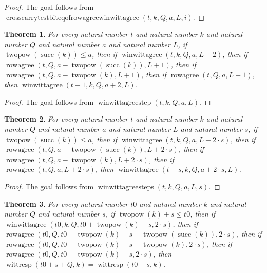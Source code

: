 \documentclass[11pt]{article}
\newtheorem{theorem}{Theorem}[section]
\theoremstyle{definition}
\begin{document}
\begin{proof}
The goal follows from \(\operatorname{crosscarrytestbiteqofrowagreewinwittagree}(t, k, Q, a, L, i)\).
\end{proof}
\begin{theorem}
\label{ll:paper:winwittagree-step}
For every natural number \(t\) and natural number \(k\) and natural number \(Q\) and natural number \(a\) and natural number \(L\), if \(\operatorname{twopow}(\operatorname{succ}(k)) \le a\), then if \(\operatorname{winwittagree}(t, k, Q, a, L + 2)\), then if \(\operatorname{rowagree}(t, Q, a - \operatorname{twopow}(\operatorname{succ}(k)), L + 1)\), then if \(\operatorname{rowagree}(t, Q, a - \operatorname{twopow}(k), L + 1)\), then if \(\operatorname{rowagree}(t, Q, a, L + 1)\), then \(\operatorname{winwittagree}(t + 1, k, Q, a + 2, L)\).
\end{theorem}
\begin{proof}
The goal follows from \(\operatorname{winwittagreestep}(t, k, Q, a, L)\).
\end{proof}
\begin{theorem}
\label{ll:paper:winwittagree-steps}
For every natural number \(t\) and natural number \(k\) and natural number \(Q\) and natural number \(a\) and natural number \(L\) and natural number \(s\), if \(\operatorname{twopow}(\operatorname{succ}(k)) \le a\), then if \(\operatorname{winwittagree}(t, k, Q, a, L + 2 \cdot s)\), then if \(\operatorname{rowagree}(t, Q, a - \operatorname{twopow}(\operatorname{succ}(k)), L + 2 \cdot s)\), then if \(\operatorname{rowagree}(t, Q, a - \operatorname{twopow}(k), L + 2 \cdot s)\), then if \(\operatorname{rowagree}(t, Q, a, L + 2 \cdot s)\), then \(\operatorname{winwittagree}(t + s, k, Q, a + 2 \cdot s, L)\).
\end{theorem}
\begin{proof}
The goal follows from \(\operatorname{winwittagreesteps}(t, k, Q, a, L, s)\).
\end{proof}
\begin{theorem}
\label{ll:paper:wittresp-eq-of-winwittagree-steps}
For every natural number \(t0\) and natural number \(k\) and natural number \(Q\) and natural number \(s\), if \(\operatorname{twopow}(k) + s \le t0\), then if \(\operatorname{winwittagree}(t0, k, Q, t0 + \operatorname{twopow}(k) - s, 2 \cdot s)\), then if \(\operatorname{rowagree}(t0, Q, t0 + \operatorname{twopow}(k) - s - \operatorname{twopow}(\operatorname{succ}(k)), 2 \cdot s)\), then if \(\operatorname{rowagree}(t0, Q, t0 + \operatorname{twopow}(k) - s - \operatorname{twopow}(k), 2 \cdot s)\), then if \(\operatorname{rowagree}(t0, Q, t0 + \operatorname{twopow}(k) - s, 2 \cdot s)\), then \(\operatorname{wittresp}(t0 + s + Q, k) = \operatorname{wittresp}(t0 + s, k)\).
\end{theorem}
\end{document}
